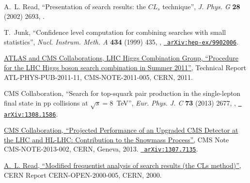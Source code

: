 \documentclass[12pt]{thesis}  %
\begin{document}
\begin{thebibliography}{100}
\hrefCMSnoop {} {A.~L. Read, ``{Presentation of search results: the $CL_{s}$
  technique}'',} \textit{ J. Phys. G} \textbf{ 28} (2002) 2693,
  \href{http://dx.doi.org/10.1088/0954-3899/28/10/313}{}.

\hrefCMSnoop {} {T.~Junk, ``Confidence level computation for combining searches
  with small statistics'',} \textit{ Nucl. Instrum. Meth. A} \textbf{ 434}
  (1999) 435,
  \href{http://dx.doi.org/10.1016/S0168-9002(99)00498-2}{},
  \href{http://www.arXiv.org/abs/hep-ex/9902006}{\texttt{
  arXiv:hep-ex/9902006}}.

\href {http://cdsweb.cern.ch/record/1379837} {{ATLAS and CMS Collaborations,
  LHC Higgs Combination Group}, ``Procedure for the {LHC} {H}iggs boson search
  combination in {S}ummer 2011'',} Technical Report ATL-PHYS-PUB-2011-11,
  CMS-NOTE-2011-005, CERN, 2011.

\hrefCMSnoop {} {{ CMS} Collaboration, ``Search for top-squark pair production
  in the single-lepton final state in pp collisions at $\sqrt{s} = 8$~{TeV}'',}
  \textit{ Eur. Phys. J. C} \textbf{ 73} (2013) 2677,
  \href{http://dx.doi.org/10.1140/epjc/s10052-013-2677-2}{},
  \href{http://www.arXiv.org/abs/1308.1586}{\texttt{ arXiv:1308.1586}}.

\href {https://cds.cern.ch/record/1565454} {{ CMS} Collaboration, ``{Projected
  Performance of an Upgraded CMS Detector at the LHC and HL-LHC: Contribution
  to the Snowmass Process}'',} CMS Note CMS-NOTE-2013-002, CERN, Geneva, 2013.
\newblock \href{http://www.arXiv.org/abs/1307.7135}{\texttt{ arXiv:1307.7135}}.

\href {http://cdsweb.cern.ch/record/451614} {A.~L. Read, ``Modified frequentist
  analysis of search results (the CLs method)'',} {CERN} Report
  CERN-OPEN-2000-005, CERN, 2000.

\end{thebibliography}\endgroup
\end{document}
